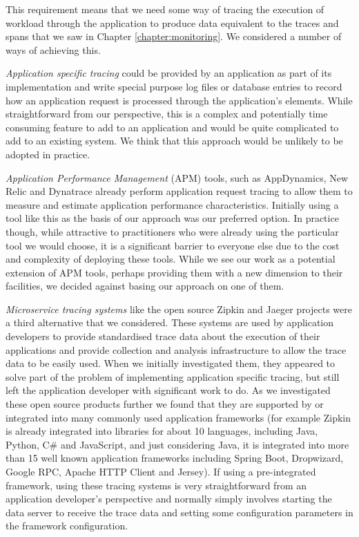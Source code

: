 This requirement means that we need some way of tracing the execution of workload through the application to produce data equivalent to the traces and spans that we saw in Chapter \ref{chapter:monitoring}.  We considered a number of ways of achieving this.

\emph{Application specific tracing} could be provided by an application as part of its implementation and write special purpose log files or database entries to record how an application request is processed through the application's elements.  While straightforward from our perspective, this is a complex and potentially time consuming feature to add to an application and would be quite complicated to add to an existing system.  We think that this approach would be unlikely to be adopted in practice.

\emph{Application Performance Management} (APM) tools, such as AppDynamics, New Relic and Dynatrace \cite{appdynamics2018, newrelic2018, dynatrace2018} already perform application request tracing to allow them to measure and estimate application performance characteristics.  Initially using a tool like this as the basis of our approach was our preferred option.  In practice though, while attractive to practitioners who were already using the particular tool we would choose, it is a significant barrier to everyone else due to the cost and complexity of deploying these tools.  While we see our work as a potential extension of APM tools, perhaps providing them with a new dimension to their facilities, we decided against basing our approach on one of them.

\emph{Microservice tracing systems} like the open source Zipkin and Jaeger \cite{zipkin2018, jaeger2018} projects were a third alternative that we considered.  These systems are used by application developers to provide standardised trace data about the execution of their applications and provide collection and analysis infrastructure to allow the trace data to be easily used.  When we initially investigated them, they appeared to solve part of the problem of implementing application specific tracing, but still left the application developer with significant work to do.  As we investigated these open source products further we found that they are supported by or integrated into many commonly used application frameworks (for example Zipkin is already integrated into libraries for about 10 languages, including Java, Python, C\# and JavaScript, and just considering Java, it is integrated into more than 15 well known application frameworks including Spring Boot, Dropwizard, Google RPC, Apache HTTP Client and Jersey).  If using a pre-integrated framework, using these tracing systems is very straightforward from an application developer's perspective and normally simply involves starting the data server to receive the trace data and setting some configuration parameters in the framework configuration.

